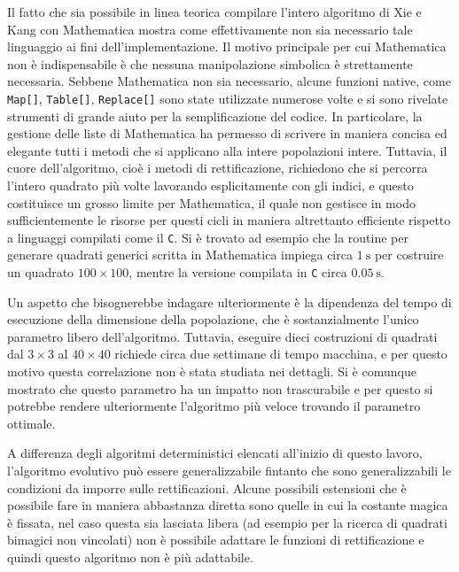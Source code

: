\documentclass[italian,twoside,twocolumn]{article}
\begin{document}
Il fatto che sia possibile in linea teorica compilare l'intero algoritmo di Xie e Kang con Mathematica mostra come effettivamente non sia necessario tale linguaggio ai fini dell'implementazione. Il motivo principale per cui Mathematica non è indispensabile è che nessuna manipolazione simbolica è strettamente necessaria. Sebbene Mathematica non sia necessario, alcune funzioni native, come \texttt{Map[]}, \texttt{Table[]}, \texttt{Replace[]} sono state utilizzate numerose volte e si sono rivelate strumenti di grande aiuto per la semplificazione del codice. In particolare, la gestione delle liste di Mathematica ha permesso di scrivere in maniera concisa ed elegante tutti i metodi che si applicano alla intere popolazioni intere. Tuttavia, il cuore dell'algoritmo, cioè i metodi di rettificazione, richiedono che si percorra l'intero quadrato più volte lavorando esplicitamente con gli indici, e questo costituisce un grosso limite per Mathematica, il quale non gestisce in modo sufficientemente le risorse per questi cicli in maniera altrettanto efficiente rispetto a linguaggi compilati come il \texttt{C}. Si è trovato ad esempio che la routine per generare quadrati generici scritta in Mathematica impiega circa $ \SI{1}{\second} $ per costruire un quadrato $ 100 \times 100 $, mentre la versione compilata in \texttt{C} circa $ \SI{0.05}{\second} $.

Un aspetto che bisognerebbe indagare ulteriormente è la dipendenza del tempo di esecuzione della dimensione della popolazione, che è sostanzialmente l'unico parametro libero dell'algoritmo. Tuttavia, eseguire dieci costruzioni di quadrati dal $ 3\times 3 $ al $ 40\times40 $ richiede circa due settimane di tempo macchina, e per questo motivo questa correlazione non è stata studiata nei dettagli. Si è comunque mostrato che questo parametro ha un impatto non trascurabile e per questo si potrebbe rendere ulteriormente l'algoritmo più veloce trovando il parametro ottimale.

A differenza degli algoritmi deterministici elencati all'inizio di questo lavoro, l'algoritmo evolutivo può essere generalizzabile fintanto che sono generalizzabili le condizioni da imporre sulle rettificazioni. Alcune possibili estensioni che è possibile fare in maniera abbastanza diretta sono quelle in cui la costante magica è fissata, nel caso questa sia lasciata libera (ad esempio per la ricerca di quadrati bimagici non vincolati) non è possibile adattare le funzioni di rettificazione e quindi questo algoritmo non è più adattabile. 
\end{document}
